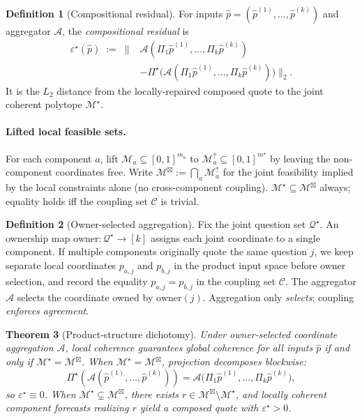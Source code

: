 \documentclass{article}
\theoremstyle{plain}
\newtheorem{theorem}{Theorem}[section]
\theoremstyle{definition}
\newtheorem{definition}[theorem]{Definition}
\theoremstyle{remark}
\newcommand{\Mloc}{\mathcal{M}_a}
\newcommand{\Mprod}{\mathcal{M}^{\boxtimes}}
\newcommand{\Mjoint}{\mathcal{M}^{\star}}
\newcommand{\Pijoint}{\Pi^{\star}}
\newcommand{\Aagg}{\mathcal{A}}
\newcommand{\Cset}{\mathcal{C}}
\newcommand{\hpK}{\hat p}
\newcommand{\eps}{\varepsilon}
\begin{document}
\begin{definition}[Compositional residual]
\label{def:compres}
For inputs $\hpK = (\hpK^{(1)},\dots,\hpK^{(k)})$ and aggregator
$\Aagg$, the \emph{compositional residual} is
\[
\begin{aligned}
\eps^\star(\hpK) \;:=\;
\bigl\|&
\Aagg(\Pi_1\hpK^{(1)},\dots,\Pi_k\hpK^{(k)})\\
&- \Pijoint\!\bigl(
\Aagg(\Pi_1\hpK^{(1)},\dots,\Pi_k\hpK^{(k)})
\bigr)\bigr\|_2.
\end{aligned}
\]
It is the $L_2$ distance from the locally-repaired composed quote
to the joint coherent polytope $\Mjoint$.
\end{definition}

\paragraph{Lifted local feasible sets.}
For each component $a$, lift $\Mloc \subseteq [0,1]^{m_a}$ to
$\Mloc^{\uparrow} \subseteq [0,1]^{m^\star}$ by leaving the
non-component coordinates free. Write
$\Mprod := \bigcap_a \Mloc^{\uparrow}$ for the joint feasibility
implied by the local constraints alone (no cross-component
coupling). $\Mjoint \subseteq \Mprod$ always; equality holds iff
the coupling set $\Cset$ is trivial.

\begin{definition}[Owner-selected aggregation]
\label{def:owner}
Fix the joint question set $\mathcal{Q}^\star$. An ownership map
$\mathrm{owner}:\mathcal{Q}^\star\!\to\![k]$ assigns each joint
coordinate to a single component. If multiple components originally
quote the same question $j$, we keep separate local coordinates
$p_{a,j}$ and $p_{b,j}$ in the product input space before owner
selection, and record the equality $p_{a,j}=p_{b,j}$ in the
coupling set $\Cset$. The aggregator $\Aagg$ selects the
coordinate owned by $\mathrm{owner}(j)$. Aggregation only
\emph{selects}; coupling \emph{enforces agreement}.
\end{definition}

\begin{theorem}[Product-structure dichotomy]
\label{thm:commute}
Under owner-selected coordinate aggregation $\Aagg$, local
coherence guarantees global coherence \emph{for all inputs}
$\hpK$ if and only if $\Mjoint = \Mprod$. When
$\Mjoint = \Mprod$, projection decomposes blockwise:
\begin{equation}
\Pijoint(\Aagg(\hpK^{(1)},\dots,\hpK^{(k)}))
= \Aagg\bigl(\Pi_1\hpK^{(1)},\dots,\Pi_k\hpK^{(k)}\bigr),
\label{eq:commute}
\end{equation}
so $\eps^\star \equiv 0$. When $\Mjoint \subsetneq \Mprod$, there
exists $r \in \Mprod \setminus \Mjoint$, and locally coherent
component forecasts realizing $r$ yield a composed quote with
$\eps^\star > 0$.
\end{theorem}
\end{document}
